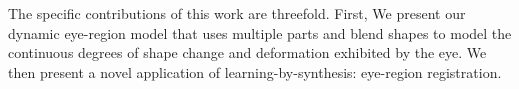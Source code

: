 The specific contributions of this work are threefold. First, 
We present our dynamic eye-region model that uses multiple parts and blend shapes to model the continuous degrees of shape change and deformation exhibited by the eye.
We then present a novel application of learning-by-synthesis: eye-region registration.